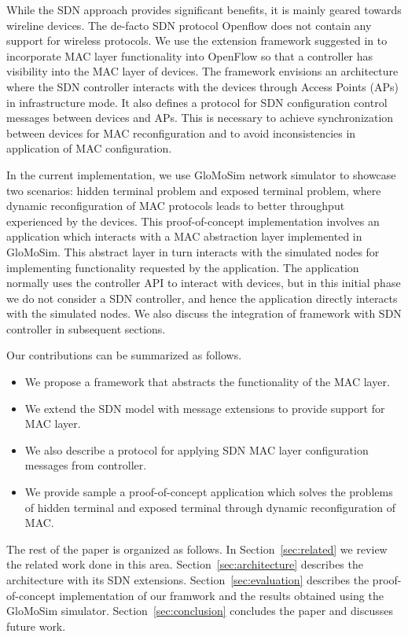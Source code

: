 While the SDN approach provides significant benefits, it is mainly geared towards wireline devices. The de-facto SDN protocol Openflow \cite{openflow} does not contain any support for wireless protocols. We use the extension framework suggested in \cite{aetherflow} to incorporate MAC layer functionality into OpenFlow so that a controller has visibility into the MAC layer of devices. The \pmac framework envisions an architecture where the SDN controller interacts with the devices through Access Points (APs) in infrastructure mode. It also defines a protocol for SDN configuration control messages between devices and APs. This is necessary to achieve synchronization between devices for MAC reconfiguration and to avoid inconsistencies in application of MAC configuration.  


In the current implementation, we use GloMoSim network simulator \cite{glomosim} to showcase two scenarios: hidden terminal problem and exposed terminal problem, where dynamic reconfiguration of MAC protocols leads to better throughput experienced by the devices. This proof-of-concept implementation involves an application which interacts with a MAC abstraction layer implemented in GloMoSim. This abstract layer in turn interacts with the simulated nodes for implementing functionality requested by the application. The application normally uses the controller API to interact with devices, but in this initial phase we do not consider a SDN controller, and hence the application directly interacts with the simulated nodes. We also discuss the integration of \pmac framework with SDN controller in subsequent sections. 


Our contributions can be summarized as follows.

\begin{itemize}
\item We propose a framework that abstracts the functionality of the MAC layer.

\item We extend the SDN model with message extensions to provide support for MAC layer.

\item We also describe a protocol for applying SDN MAC layer configuration messages from controller.  

\item We provide sample a proof-of-concept application which solves the problems of hidden terminal and exposed terminal through dynamic reconfiguration of MAC.
\end{itemize}

The rest of the paper is organized as follows. In Section~\ref{sec:related} we review the related work done in this area. Section~\ref{sec:architecture} describes the \pmac architecture with its SDN extensions. Section~\ref{sec:evaluation} describes the proof-of-concept implementation of our framwork and the results obtained using the GloMoSim simulator. Section~\ref{sec:conclusion} concludes the paper and discusses future work.
